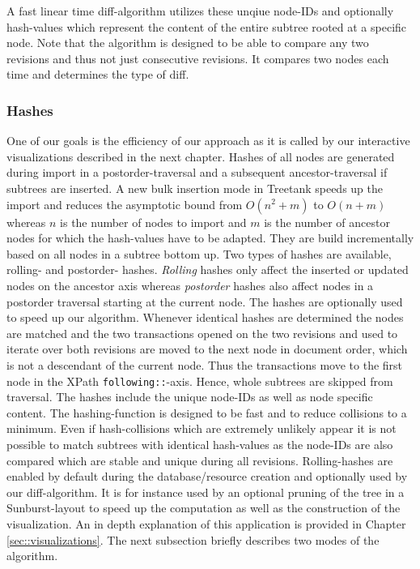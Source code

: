 A fast linear time diff-algorithm utilizes these unqiue node-IDs and optionally hash-values which represent the content of the entire subtree rooted at a specific node. Note that the algorithm is designed to be able to compare any two revisions and thus not just consecutive revisions. It compares two nodes each time and determines the type of diff. 


\subsubsection{Hashes} One of our goals is the efficiency of our approach as it is called by our interactive visualizations described in the next chapter. Hashes of all nodes are generated during import in a postorder-traversal and a subsequent ancestor-traversal if subtrees are inserted. A new bulk insertion mode in Treetank speeds up the import and reduces the asymptotic bound from $O(n^2+m)$ to $O(n+m)$ whereas $n$ is the number of nodes to import and $m$ is the number of ancestor nodes for which the hash-values have to be adapted. They are build incrementally based on all nodes in a subtree bottom up. Two types of hashes are available, rolling\cite{Rolling2011}- and postorder\cite{Integrity2010}- hashes. \emph{Rolling} hashes only affect the inserted or updated nodes on the ancestor axis whereas \emph{postorder} hashes also affect nodes in a postorder traversal starting at the current node. The hashes are optionally used to speed up our algorithm. Whenever identical hashes are determined the nodes are matched and the two transactions opened on the two revisions and used to iterate over both revisions are moved to the next node in document order, which is not a descendant of the current node. Thus the transactions move to the first node in the XPath \texttt{following::}-axis. Hence, whole subtrees are skipped from traversal. The hashes include the unique node-IDs as well as node specific content. The hashing-function is designed to be fast and to reduce collisions to a minimum. Even if hash-collisions which are extremely unlikely appear it is not possible to match subtrees with identical hash-values as the node-IDs are also compared which are stable and unique during all revisions. Rolling-hashes are enabled by default during the database/resource creation and optionally used by our diff-algorithm. It is for instance used by an optional pruning of the tree in a Sunburst-layout to speed up the computation as well as the construction of the visualization. An in depth explanation of this application is provided in Chapter \ref{sec::visualizations}. The next subsection briefly describes two modes of the algorithm.

